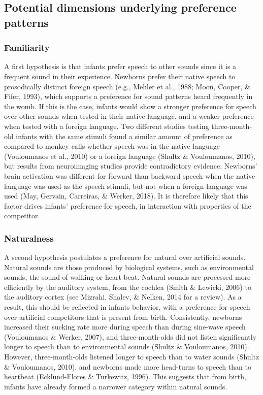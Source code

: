 \documentclass[man]{apa6}
\begin{document}
\subsection{Potential dimensions underlying preference
patterns}\label{potential-dimensions-underlying-preference-patterns}

\subsubsection{Familiarity}\label{familiarity}

A first hypothesis is that infants prefer speech to other sounds since
it is a frequent sound in their experience. Newborns prefer their native
speech to prosodically distinct foreign speech (e.g., Mehler et al.,
1988; Moon, Cooper, \& Fifer, 1993), which supports a preference for
sound patterns heard frequently in the womb. If this is the case,
infants would show a stronger preference for speech over other sounds
when tested in their native language, and a weaker preference when
tested with a foreign language. Two different studies testing
three-month-old infants with the same stimuli found a similar amount of
preference as compared to monkey calls whether speech was in the native
language (Vouloumanos et al., 2010) or a foreign language (Shultz \&
Vouloumanos, 2010), but results from neuroimaging studies provide
contradictory evidence. Newborns' brain activation was different for
forward than backward speech when the native language was used as the
speech stimuli, but not when a foreign language was used (May, Gervain,
Carreiras, \& Werker, 2018). It is therefore likely that this factor
drives infants' preference for speech, in interaction with properties of
the competitor.

\subsubsection{Naturalness}\label{naturalness}

A second hypothesis postulates a preference for natural over artificial
sounds. Natural sounds are those produced by biological systems, such as
environmental sounds, the sound of walking or heart beat. Natural sounds
are processed more efficiently by the auditory system, from the cochlea
(Smith \& Lewicki, 2006) to the auditory cortex (see Mizrahi, Shalev, \&
Nelken, 2014 for a review). As a result, this should be reflected in
infants behavior, with a preference for speech over artificial
competitors that is present from birth. Consistently, newborns increased
their sucking rate more during speech than during sine-wave speech
(Vouloumanos \& Werker, 2007), and three-month-olds did not listen
significantly longer to speech than to environmental sounds (Shultz \&
Vouloumanos, 2010). However, three-month-olds listened longer to speech
than to water sounds (Shultz \& Vouloumanos, 2010), and newborns made
more head-turns to speech than to heartbeat (Ecklund-Flores \&
Turkewitz, 1996). This suggests that from birth, infants have already
formed a narrower category within natural sounds.
\end{document}
